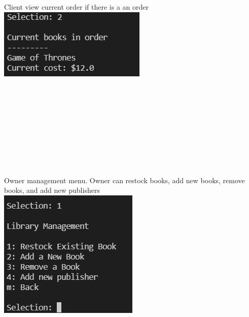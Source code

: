 \documentclass[Project Report]{article}
\begin{document}
Client view current order if there is a an order\\
{\centering \includegraphics[width=\textwidth]{../Screenshots/Client_view_current_order.PNG}}\\\\\\\\\\\\\\\\\\\

Owner management menu. Owner can restock books, add new books, remove books, and add new publishers\\
{\centering \includegraphics[width=\textwidth]{../Screenshots/Owner_management_menu.PNG}}\\\\\\\\\\\\\\\\\\\\\\\\\\\\\\\\
\end{document}
